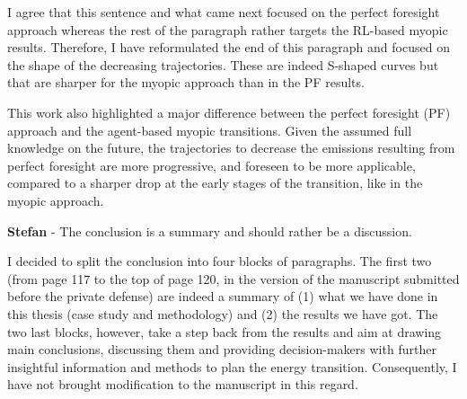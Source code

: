 \documentclass[12pt,a4paper]{article}
\begin{document}
\noindent I agree that this sentence and what came next focused on the perfect foresight approach whereas the rest of the paragraph rather targets the RL-based myopic results. Therefore, I have reformulated {\color{blue}the end of this paragraph} and focused on the shape of the decreasing  trajectories. These are indeed S-shaped curves but that are sharper for the myopic approach than in the PF results.

\begin{mdframed}[style=manuscript] %
This work also highlighted a major difference between the perfect foresight (PF) approach and the agent-based myopic transitions. Given the assumed full knowledge on the future, the trajectories to decrease the  emissions resulting from perfect foresight are more progressive, and foreseen to be more applicable, compared to a sharper drop at the early stages of the transition, like in the myopic approach.
\end{mdframed}

\begin{mdframed}[style=comment] %
{\color{teal} \textbf{Stefan}} - The conclusion is a summary and should rather be a discussion.
\end{mdframed}

\noindent I decided to split the conclusion into four blocks of paragraphs. The first two (from page 117 to the top of page 120, in the version of the manuscript submitted before the private defense) are indeed a summary of (1) what we have done in this thesis (case study and methodology) and (2) the results we have got. The two last blocks, however, take a step back from the results and aim at drawing main conclusions, discussing them and providing decision-makers with further insightful information and methods to plan the energy transition. Consequently, I have not brought modification to the manuscript in this regard.

\clearpage
\def\bibfont{\scriptsize}

\normalsize
\end{document}
